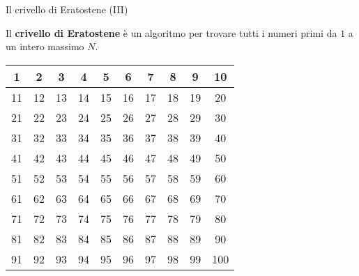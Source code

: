 \begin{frame}{Il crivello di Eratostene (III)}

  Il \textbf{crivello di Eratostene} è un algoritmo per trovare
  tutti i numeri primi da $1$ a un intero massimo $N$.

  \begin{table}[]
  \centering
    \begin{tabular}{|c|c|c|c|c|c|c|c|c|c|}
    \hline
    \cellcolor[HTML]{C0C0C0}1 & {\color[HTML]{FE0000} 2}          & 3  & 4  & 5  & 6  & 7  & 8  & 9  & 10  \\ \hline
    11                        & 12                                & 13 & 14 & 15 & 16 & 17 & 18 & 19 & 20  \\ \hline
    21                        & 22                                & 23 & 24 & 25 & 26 & 27 & 28 & 29 & 30  \\ \hline
    31                        & 32                                & 33 & 34 & 35 & 36 & 37 & 38 & 39 & 40  \\ \hline
    41                        & 42                                & 43 & 44 & 45 & 46 & 47 & 48 & 49 & 50  \\ \hline
    51                        & 52                                & 53 & 54 & 55 & 56 & 57 & 58 & 59 & 60  \\ \hline
    61                        & 62                                & 63 & 64 & 65 & 66 & 67 & 68 & 69 & 70  \\ \hline
    71                        & 72                                & 73 & 74 & 75 & 76 & 77 & 78 & 79 & 80  \\ \hline
    81                        & 82                                & 83 & 84 & 85 & 86 & 87 & 88 & 89 & 90  \\ \hline
    91                        & 92                                & 93 & 94 & 95 & 96 & 97 & 98 & 99 & 100 \\ \hline
    \end{tabular}
  \end{table}

\end{frame}

